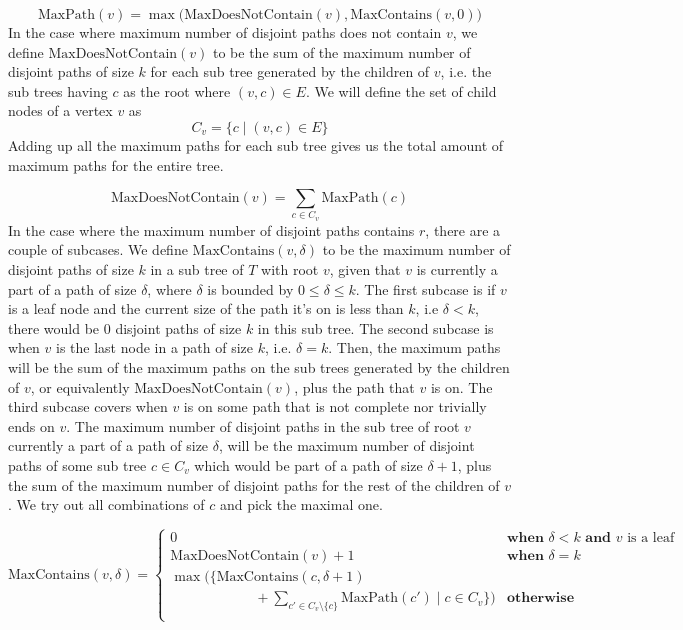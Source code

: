 \documentclass[11pt]{scrartcl}
\newcommand{\maxp}{\text{MaxPath}}
\newcommand{\ctn}{\text{MaxContains}}
\newcommand{\dctn}{\text{MaxDoesNotContain}}
\begin{document}
$$
	\maxp(v) = \max \Big(\dctn(v), \ctn(v, 0) \Big)
$$
In the case where maximum number of disjoint paths does not contain $v$, we define
$\dctn(v)$ to be the sum of
the maximum number of disjoint paths of size $k$ for each sub tree generated by the children of $v$,
i.e. the sub trees having $c$ as the root where $(v,c) \in E$.
We will define the set of child nodes of a vertex $v$ as $$C_v = \Big\{c \mid (v,c) \in E\Big\}$$
Adding up all the maximum paths for each sub tree
gives us the total amount of maximum paths for the entire tree.

$$
	\dctn(v) = \sum_{c \in C_v } \maxp(c)
$$
In the case where the maximum number of disjoint paths contains $r$, there are a couple of subcases.
We define $\ctn(v,\delta)$ to be the maximum number of disjoint paths of size $k$
in a sub tree of $T$ with root $v$, given that
$v$ is currently a part of a path of size $\delta$, where $\delta$ is bounded by $0 \leq \delta \leq k$.
The first subcase is if $v$ is a leaf node and the current size of the path it's on is less than $k$,
i.e $\delta < k$, there would be $0$ disjoint paths of size $k$ in this sub tree.
The second subcase is when $v$ is the last node in a path of size $k$, i.e. $\delta = k$. Then, the
maximum paths will be the sum of the maximum paths on the sub trees generated by the children of
$v$, or equivalently $\dctn(v)$, plus the path that $v$ is on.
The third subcase covers when $v$ is on some path that is not complete nor trivially ends on $v$.
The maximum number of disjoint paths in the sub tree of root $v$ currently a part of a path of size $\delta$,
will be the maximum number of disjoint paths of some sub tree $c \in C_v$ which would be
part of a path of size $\delta + 1$, plus the sum of the maximum number of disjoint paths for
the rest of the children of $v$. We try out all combinations of $c$ and pick the maximal one.

$$
	\ctn(v,\delta) =
	\begin{cases}
		0            & \textbf{when } \delta < k \textbf{ and } v \text{ is a leaf} \\
		\dctn(v) + 1 & \textbf{when } \delta = k                                    \\
		\max\bigg(\Big\{
		\ctn(c,\delta + 1)                                                          \\
		\qquad \qquad \qquad
		+ \displaystyle\sum_{c' \in C_v \setminus \{c\}} \maxp(c') \mid c \in C_v
		\Big\}\bigg) & \textbf{otherwise}                                           \\
	\end{cases}
$$
\end{document}
